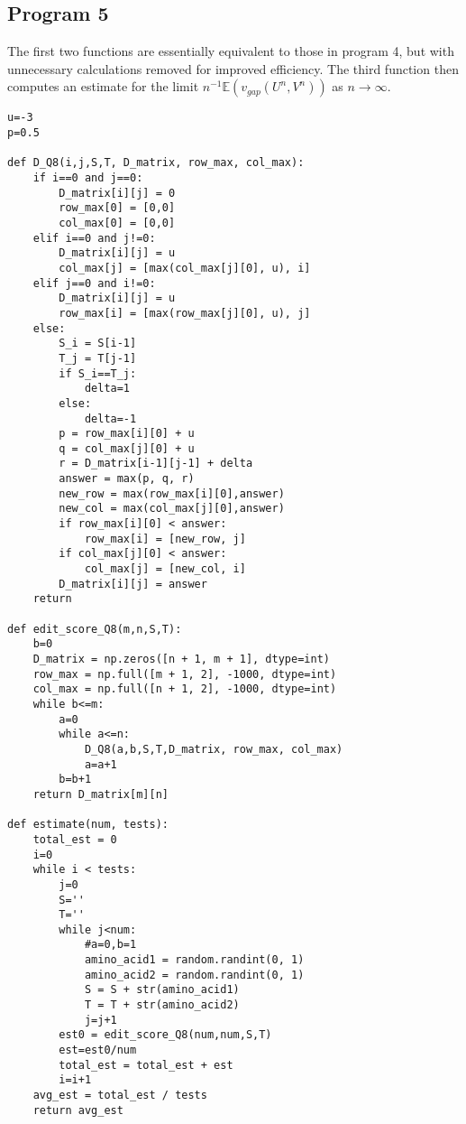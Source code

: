 \documentclass{article}
\begin{document}
\subsection{Program 5}
\vspace{-0.3cm}
\label{subsec:Program 5} 
The first two functions are essentially equivalent to those in program 4, but with unnecessary calculations removed for improved efficiency. The third function then computes an estimate for the limit $n^{-1}\mathbb{E}(v_{gap}(U^n,V^n))$ as $n\to\infty$.
\begin{lstlisting}
u=-3
p=0.5

def D_Q8(i,j,S,T, D_matrix, row_max, col_max):
    if i==0 and j==0:
        D_matrix[i][j] = 0
        row_max[0] = [0,0]
        col_max[0] = [0,0]
    elif i==0 and j!=0:
        D_matrix[i][j] = u
        col_max[j] = [max(col_max[j][0], u), i]
    elif j==0 and i!=0:
        D_matrix[i][j] = u
        row_max[i] = [max(row_max[j][0], u), j]
    else:
        S_i = S[i-1]
        T_j = T[j-1]
        if S_i==T_j:
            delta=1
        else:
            delta=-1
        p = row_max[i][0] + u
        q = col_max[j][0] + u
        r = D_matrix[i-1][j-1] + delta
        answer = max(p, q, r)
        new_row = max(row_max[i][0],answer)
        new_col = max(col_max[j][0],answer)
        if row_max[i][0] < answer:
            row_max[i] = [new_row, j]
        if col_max[j][0] < answer:
            col_max[j] = [new_col, i]
        D_matrix[i][j] = answer
    return

def edit_score_Q8(m,n,S,T):
    b=0
    D_matrix = np.zeros([n + 1, m + 1], dtype=int)
    row_max = np.full([m + 1, 2], -1000, dtype=int)
    col_max = np.full([n + 1, 2], -1000, dtype=int)
    while b<=m:
        a=0
        while a<=n:
            D_Q8(a,b,S,T,D_matrix, row_max, col_max)
            a=a+1
        b=b+1
    return D_matrix[m][n]

def estimate(num, tests):
    total_est = 0
    i=0
    while i < tests:
        j=0
        S=''
        T=''
        while j<num:
            #a=0,b=1
            amino_acid1 = random.randint(0, 1)
            amino_acid2 = random.randint(0, 1)
            S = S + str(amino_acid1)
            T = T + str(amino_acid2)
            j=j+1
        est0 = edit_score_Q8(num,num,S,T)
        est=est0/num
        total_est = total_est + est
        i=i+1
    avg_est = total_est / tests
    return avg_est
\end{lstlisting}
\vspace{-0.5cm}
\end{document}
